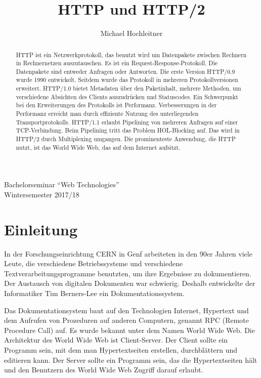 \documentclass{llncs}
\begin{document}
\title{HTTP und HTTP/2}
\author{Michael Hochleitner}

\maketitle 
\begin{center}
Bachelorseminar ``Web Technologies'' \\
Wintersemester 2017/18
\end{center}

\begin{abstract}
HTTP ist ein Netzwerkprotokoll, das benutzt wird um Datenpakete zwischen Rechnern in Rechnernetzen auszutauschen. Es ist ein Request-Response-Protokoll. Die Datenpakete sind entweder Anfragen oder Antworten. Die erste Version HTTP/0.9 wurde 1990 entwickelt. Seitdem wurde das Protokoll in mehreren Protokollversionen erweitert. HTTP/1.0 bietet Metadaten über den Paketinhalt, mehrere Methoden, um verschiedene Absichten des Clients auszudrücken  und Statuscodes.
Ein Schwerpunkt bei den Erweiterungen des Protokolls ist Performanz. Verbesserungen in der Performanz erreicht man durch effiziente Nutzung des unterliegenden Transportprotokolls. HTTP/1.1 erlaubt Pipelining von mehreren Anfragen auf einer TCP-Verbindung. Beim Pipelining tritt das Problem HOL-Blocking auf. Das wird in HTTP/2 durch Multiplexing umgangen.  Die prominenteste Anwendung, die HTTP nutzt, ist das World Wide Web, das auf dem Internet aufsitzt.
\end{abstract}

\section{Einleitung}
In der Forschungseinrichtung CERN in Genf arbeiteten in den 90er Jahren viele Leute, die verschiedene Betriebssysteme und verschiedene Textverarbeitungsprogramme benutzten, um ihre Ergebnisse zu dokumentieren. Der Austausch von digitalen Dokumenten war schwierig. Deshalb entwickelte der Informatiker Tim Berners-Lee ein Dokumentationssystem. \cite{Berners-Lee1999}

Das Dokumentationsystem baut auf den Technologien Internet, Hypertext und dem Aufrufen von Prozeduren auf anderen Computern, genannt RPC (Remote Procedure Call) auf. Es wurde bekannt unter dem Namen World Wide Web. Die Architektur des World Wide Web ist Client-Server. Der Client sollte ein Programm sein, mit dem man Hypertextseiten erstellen, durchblättern und editieren kann. Der Server sollte ein Programm sein, das die Hypertextseiten hält und den Benutzern des World Wide Web Zugriff darauf erlaubt.\cite{Berners-Lee1999}
\end{document}
